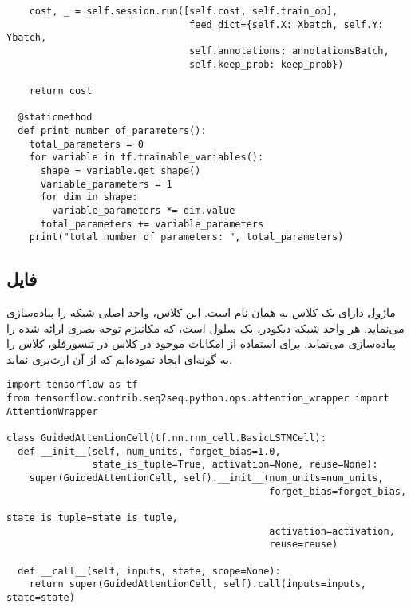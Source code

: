 \begin{latin}
\begin{verbatim}
    cost, _ = self.session.run([self.cost, self.train_op], 
                                feed_dict={self.X: Xbatch, self.Y: Ybatch,
                                self.annotations: annotationsBatch,
                                self.keep_prob: keep_prob})

    return cost

  @staticmethod
  def print_number_of_parameters():
    total_parameters = 0
    for variable in tf.trainable_variables():
      shape = variable.get_shape()
      variable_parameters = 1
      for dim in shape:
        variable_parameters *= dim.value
      total_parameters += variable_parameters
    print("total number of parameters: ", total_parameters)

\end{verbatim}
\end{latin}




\subsection*{فایل }
ماژول  دارای یک کلاس به همان نام است. این کلاس، واحد اصلی شبکه را پیاده‌سازی می‌نماید. هر واحد شبکه دیکودر، یک سلول  است، که مکانیزم توجه بصری ارائه شده را پیاده‌سازی می‌نماید. برای استفاده از امکانات موجود در کلاس  در تنسورفلو، کلاس  را به گونه‌ای ایجاد نموده‌ایم که از آن ارث‌بری نماید.
\begin{latin}
\begin{verbatim}
import tensorflow as tf
from tensorflow.contrib.seq2seq.python.ops.attention_wrapper import AttentionWrapper

class GuidedAttentionCell(tf.nn.rnn_cell.BasicLSTMCell):
  def __init__(self, num_units, forget_bias=1.0,
               state_is_tuple=True, activation=None, reuse=None):
    super(GuidedAttentionCell, self).__init__(num_units=num_units, 
                                              forget_bias=forget_bias,
                                              state_is_tuple=state_is_tuple, 
                                              activation=activation,
                                              reuse=reuse)

  def __call__(self, inputs, state, scope=None):
    return super(GuidedAttentionCell, self).call(inputs=inputs, state=state)

\end{verbatim}
\end{latin}


